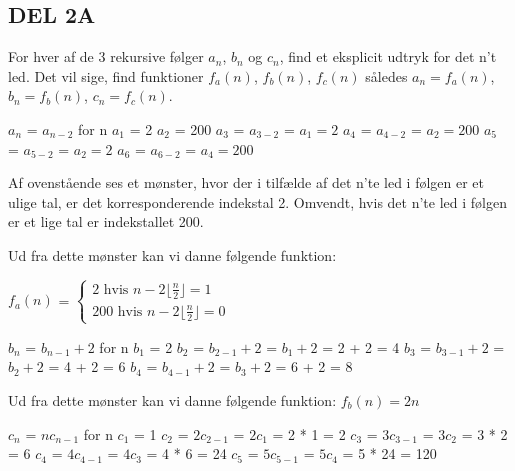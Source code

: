 \documentclass[a4paper]{article}
\begin{document}
\subsection{DEL 2A}
For hver af de 3 rekursive følger $a_{n}$, $b_{n}$ og $c_{n}$, find et eksplicit udtryk for det n't led. Det vil sige, find funktioner $f_{a}(n)$, $f_{b}(n)$, $f_{c}(n)$ således $a_{n} = f_{a}(n)$, 
$b_{n} = f_{b}(n)$, $c_{n} = f_{c}(n)$.

\bigskip 
\noindent
$a_{n}$ = $a_{n-2}$ for n 
\newline $a_{1}$ = 2
\newline $a_{2}$ = 200
\newline $a_{3}$ = $a_{3-2}$ = $a_{1} = 2$
\newline $a_{4}$ = $a_{4-2}$ = $a_{2} = 200$
\newline $a_{5}$ = $a_{5-2}$ = $a_{2} = 2$
\newline $a_{6}$ = $a_{6-2}$ = $a_{4} = 200$

\noindent
\newline\newline
Af ovenstående ses et mønster, hvor der i tilfælde af det n'te led i følgen er et ulige tal, er det korresponderende  indekstal 2. Omvendt, hvis det n'te led i følgen er et lige tal er indekstallet 200. 

\noindent
\newline\newline
Ud fra dette mønster kan vi danne følgende funktion: 

\noindent
\bigskip
$f_{a}(n)$ = $\left\{\begin{array}{cc} 2 \mbox{~hvis~} n-2\lfloor{\frac{n}{2}}\rfloor = 1 \\
200 \mbox{~hvis~} n-2\lfloor{\frac{n}{2}}\rfloor = 0 \end{array}\right.$

\bigskip
\noindent
$b_{n}$ = $b_{n-1} + 2$ for n 
\newline $b_{1}$ = 2
\newline $b_{2}$ = $b_{2-1} + 2$ = $b_{1} + 2$ = 2 + 2 = 4
\newline $b_{3}$ = $b_{3-1} + 2$ = $b_{2} + 2$ = 4 + 2 = 6
\newline $b_{4}$ = $b_{4-1} + 2$ = $b_{3} + 2$ = 6 + 2 = 8

\noindent
\newline
Ud fra dette mønster kan vi danne følgende funktion: $f_{b}(n) = 2n$

\bigskip
\noindent
$c_{n}$ = $nc_{n-1}$ for n 
\newline $c_{1}$ = 1
\newline $c_{2}$ = $2c_{2-1}$ = $2c_{1}$ = 2 * 1 = 2
\newline $c_{3}$ = $3c_{3-1}$ = $3c_{2}$ = 3 * 2 = 6
\newline $c_{4}$ = $4c_{4-1}$ = $4c_{3}$ = 4 * 6 = 24
\newline $c_{5}$ = $5c_{5-1}$ = $5c_{4}$ = 5 * 24 = 120
\end{document}
